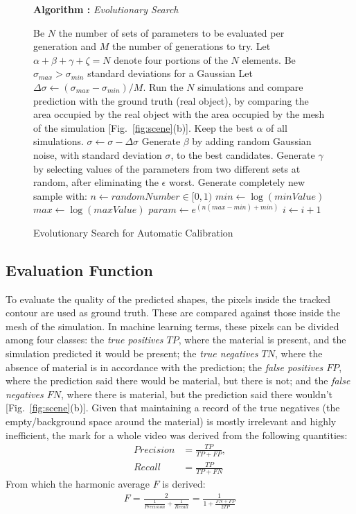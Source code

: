 \documentclass[journal]{IEEEtran}
\newcommand{\fref}[1]{Fig.~\ref{#1}}
\newcounter{algorithm}
\newenvironment{algorithmicieee}[1]
  {\refstepcounter{algorithm}
   \begin{lrbox}{\ieeealgbox}
   \begin{minipage}{\dimexpr\columnwidth-2\fboxsep-2\fboxrule}
   \textbf{Algorithm \arabic{algorithm}:} \textit{#1} \par
   \begin{algorithmic}[1]}
  {\end{algorithmic}
   \end{minipage}
   \end{lrbox}\noindent\fbox{\usebox{\ieeealgbox}}}
\begin{document}
\begin{figure}
  \begin{algorithmicieee}{Evolutionary Search}\label{alg:genetic}
 \STATE Be $N$ the number of sets of parameters to be evaluated per generation and $M$ the number of generations to try.
 \STATE Let $\alpha + \beta + \gamma + \zeta = N$ denote four portions of the $N$ elements.
 \STATE Be $\sigma_{max} > \sigma_{min}$ standard deviations for a Gaussian
 \STATE Let $\Delta\sigma \gets (\sigma_{max} - \sigma_{min})/M$.
 \STATE Run the $N$ simulations and compare prediction with the ground truth (real object), by comparing the area occupied by the real object with the area occupied by the mesh of the simulation [\fref{fig:scene}(b)].
 \STATE Keep the best $\alpha$ of all simulations.
 \STATE $\sigma \gets \sigma - \Delta\sigma$
 \STATE Generate $\beta$ by adding random Gaussian noise, with standard deviation $\sigma$, to the best candidates.
 \STATE Generate $\gamma$ by selecting values of the parameters from two different sets at random, after eliminating the $\epsilon$ worst.
   \STATE Generate completely new sample with:
     \STATE $n \leftarrow randomNumber \in [0,1)$
     \STATE $min \leftarrow \log(minValue)$
     \STATE $max \leftarrow \log(maxValue)$
     \STATE $param \leftarrow e^{(n (max - min) + min)}$
   \ENDFOR
 \ENDFOR
 \STATE $i \gets i + 1$
 \ENDFOR
\end{algorithmicieee}
 \caption{Evolutionary Search for Automatic Calibration}
\end{figure}



\subsection{Evaluation Function}
\label{sec:evaluation}

To evaluate the quality of the predicted shapes, the pixels inside the tracked contour are used as ground truth.  These are  compared against those inside the mesh of the simulation.  In machine learning terms, these pixels can be divided among four classes: the \textit{true positives $TP$}, where the material is present, and the simulation predicted it would be present; the \textit{true negatives $TN$}, where the absence of material is in accordance with the prediction; the \textit{false positives $FP$}, where the prediction said there would be material, but there is not; and the \textit{false negatives $FN$}, where there is material, but the prediction said there wouldn't [\fref{fig:scene}(b)].  Given that maintaining a record of the true negatives (the empty/background space around the material) is mostly irrelevant and highly inefficient, the mark for a whole video was derived from the following quantities:
\begin{align}
 Precision &= \frac{TP}{TP+FP}, \\
 Recall &= \frac{TP}{TP+FN}
\end{align}
From which the harmonic average $F$ is derived:
\begin{align}
 F = \frac{2}{\frac{1}{Precision} + \frac{1}{Recall}} = \frac{1}{1 + \frac{FN + FP}{2TP}}
\end{align}
\end{document}
